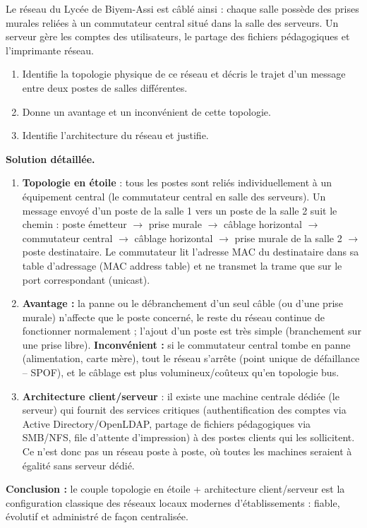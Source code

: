 \documentclass[11pt]{article}
\begin{document}
\begin{exoresolu}
Le réseau du Lycée de Biyem-Assi est câblé ainsi : chaque salle possède des prises murales reliées à un commutateur central situé dans la salle des serveurs. Un serveur gère les comptes des utilisateurs, le partage des fichiers pédagogiques et l'imprimante réseau.
\begin{enumerate}
  \item Identifie la topologie physique de ce réseau et décris le trajet d'un message entre deux postes de salles différentes.
  \item Donne un avantage et un inconvénient de cette topologie.
  \item Identifie l'architecture du réseau et justifie.
\end{enumerate}
\tcblower
\textbf{Solution détaillée.}
\begin{enumerate}
  \item \textbf{Topologie en étoile} : tous les postes sont reliés individuellement à un équipement central (le commutateur central en salle des serveurs). Un message envoyé d'un poste de la salle 1 vers un poste de la salle 2 suit le chemin : poste émetteur $\rightarrow$ prise murale $\rightarrow$ câblage horizontal $\rightarrow$ commutateur central $\rightarrow$ câblage horizontal $\rightarrow$ prise murale de la salle 2 $\rightarrow$ poste destinataire. Le commutateur lit l'adresse MAC du destinataire dans sa table d'adressage (MAC address table) et ne transmet la trame que sur le port correspondant (unicast).
  \item \textbf{Avantage :} la panne ou le débranchement d'un seul câble (ou d'une prise murale) n'affecte que le poste concerné, le reste du réseau continue de fonctionner normalement ; l'ajout d'un poste est très simple (branchement sur une prise libre). \textbf{Inconvénient :} si le commutateur central tombe en panne (alimentation, carte mère), tout le réseau s'arrête (point unique de défaillance -- SPOF), et le câblage est plus volumineux/coûteux qu'en topologie bus.
  \item \textbf{Architecture client/serveur} : il existe une machine centrale dédiée (le serveur) qui fournit des services critiques (authentification des comptes via Active Directory/OpenLDAP, partage de fichiers pédagogiques via SMB/NFS, file d'attente d'impression) à des postes clients qui les sollicitent. Ce n'est donc pas un réseau poste à poste, où toutes les machines seraient à égalité sans serveur dédié.
\end{enumerate}
\textbf{Conclusion :} le couple topologie en étoile + architecture client/serveur est la configuration classique des réseaux locaux modernes d'établissements : fiable, évolutif et administré de façon centralisée.
\end{exoresolu}
\end{document}
